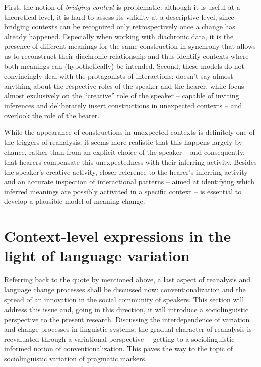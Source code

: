 First, the notion of \textit{bridging context} is problematic: although it is useful at a theoretical level, it is hard to assess its validity at a descriptive level, since bridging contexts can be recognized only retrospectively once a change has already happened. Especially when working with diachronic data, it is the presence of different meanings for the same construction in synchrony that allows us to reconstruct their diachronic relationship and thus identify contexts where both meanings can (hypothetically) be intended. Second, these models do not convincingly deal with the protagonists of interactions: \citet{Heine2002} doesn’t say almost anything about the respective roles of the speaker and the hearer, while \citet{TraugottDasher2002} focus almost exclusively on the “creative” role of the speaker – capable of inviting inferences and deliberately insert constructions in unexpected contexts – and overlook the role of the hearer.

While the appearance of constructions in unexpected contexts is definitely one of the triggers of reanalysis, it seems more realistic that this happens largely by chance, rather than from an explicit choice of the speaker – and consequently, that hearers compensate this unexpectedness with their inferring activity. Besides the speaker’s creative activity, closer reference to the hearer’s inferring activity and an accurate inspection of interactional patterns – aimed at identifying which inferred meanings are possibly activated in a specific context – is essential to develop a plausible model of meaning change.

\section{Context-level expressions in the light of language variation}
\hypertarget{Toc124860635}{}
Referring back to the quote by \citet{DetgesWaltereit2016} mentioned above, a last aspect of reanalysis and language change processes shall be discussed now: conventionalization and the spread of an innovation in the social community of speakers. This section will address this issue and, going in this direction, it will introduce a sociolinguistic perspective to the present research. Discussing the interdependence of variation and change processes in linguistic systems, the gradual character of reanalysis is reevaluated through a variational perspective~– getting to a sociolinguistic-informed notion of conventionalization. This paves the way to the topic of sociolinguistic variation of pragmatic markers.

